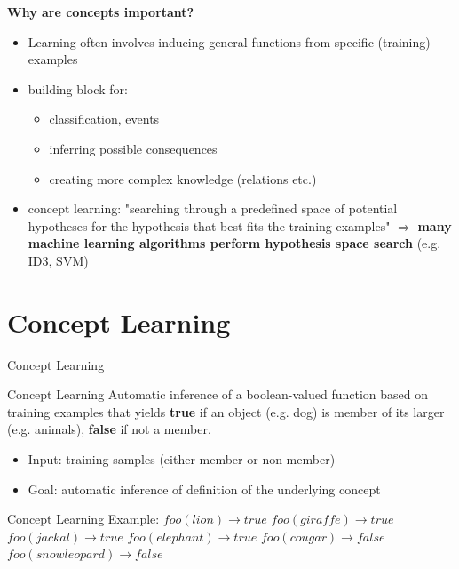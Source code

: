 \documentclass{beamer}
\begin{document}
\begin{frame}
\textbf{Why are concepts important?}
\begin{itemize}
\item Learning often involves inducing general functions from specific (training) examples %
\item building block for: 
	\begin{itemize}
		\item classification, events
        \item inferring possible consequences
        \item creating more complex knowledge (relations etc.)
	\end{itemize}
\item concept learning: "searching through a predefined space of potential hypotheses for the hypothesis that best fits the training examples" \cite{mitchell1997a}
$\Rightarrow$ \textbf{many machine learning algorithms perform hypothesis space search} (e.g. ID3, SVM)
\end{itemize}

\end{frame}


\section{Concept Learning}
\begin{frame}{Concept Learning}

\begin{block}{Concept Learning}
Automatic inference of a boolean-valued function based on training examples that yields \textbf{true} if an object (e.g. dog) is member of its larger  (e.g. animals), \textbf{false} if not a member.
\end{block}
\begin{itemize}
\item Input: training samples (either member or non-member)
\item Goal: automatic inference of definition of the underlying concept 
\end{itemize}
\end{frame}

\begin{frame}{Concept Learning}
Example:\newline
$foo(lion) \rightarrow true $\newline
$foo(giraffe) \rightarrow true $\newline
$foo(jackal) \rightarrow true $\newline
$foo(elephant) \rightarrow true $\newline
$foo(cougar) \rightarrow false $\newline
$foo(snow leopard) \rightarrow false $\newline
\end{frame}
\end{document}
